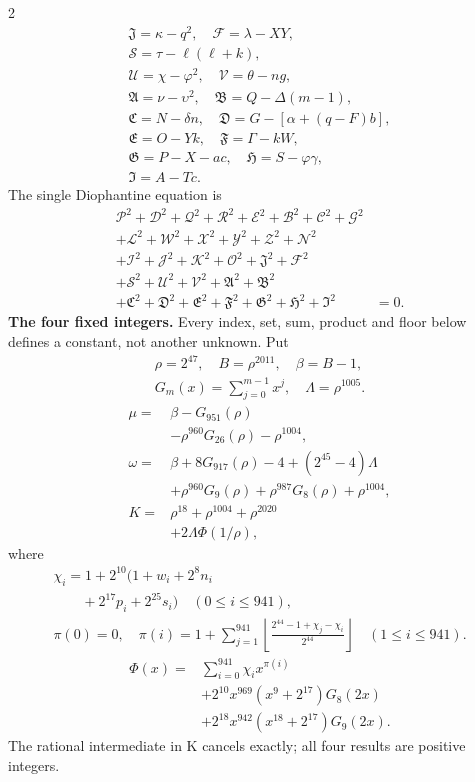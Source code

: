 \documentclass[10pt]{article}
\newcommand{\fl}[1]{\left\lfloor#1\right\rfloor}
\begin{document}
\begin{multicols}{2}
\[\begin{gathered}
\mathfrak{J}=\kappa-q^2,\quad\mathcal{F}=\lambda-XY,\\
\mathcal{S}=\tau-\ell(\ell+k),\\
\mathcal{U}=\chi-\varphi^2,\quad\mathcal{V}=\theta-ng,\\
\mathfrak{A}=\nu-\upsilon^2,\quad\mathfrak{B}=Q-\Delta(m-1),\\
\mathfrak{C}=N-\delta n,\quad\mathfrak{D}=G-[\alpha+(q-F)b],\\
\mathfrak{E}=O-Yk,\quad\mathfrak{F}=\Gamma-kW,\\
\mathfrak{G}=P-X-ac,\quad\mathfrak{H}=S-\varphi\gamma,\\
\mathfrak{I}=A-Tc.
\end{gathered}
\]
The single Diophantine equation is
\[
\begin{split}
\mathcal{P}^2+\mathcal{D}^2+\mathcal{Q}^2+\mathcal{R}^2+\mathcal{E}^2+\mathcal{B}^2+\mathcal{C}^2+\mathcal{G}^2 &\\
+\mathcal{L}^2+\mathcal{W}^2+\mathcal{X}^2+\mathcal{Y}^2+\mathcal{Z}^2+\mathcal{N}^2 &\\
+\mathcal{I}^2+\mathcal{J}^2+\mathcal{K}^2+\mathcal{O}^2+\mathfrak{J}^2+\mathcal{F}^2 &\\
+\mathcal{S}^2+\mathcal{U}^2+\mathcal{V}^2+\mathfrak{A}^2+\mathfrak{B}^2 &\\
+\mathfrak{C}^2+\mathfrak{D}^2+\mathfrak{E}^2+\mathfrak{F}^2+\mathfrak{G}^2+\mathfrak{H}^2+\mathfrak{I}^2 &= 0.
\end{split}
\]
\textbf{The four fixed integers.}
Every index, set, sum, product and floor below defines a constant, not
another unknown. Put
\[
\begin{gathered}
\rho=2^{47},\quad B=\rho^{2011},\quad\beta=B-1,\\
G_m(x)=\sum_{j=0}^{m-1}x^j,\quad
\Lambda=\rho^{1005}.
\end{gathered}
\]
\begin{align*}
\mu={}&\beta-G_{951}(\rho)\\
&-\rho^{960}G_{26}(\rho)-\rho^{1004},\\
\omega={}&\beta+8G_{917}(\rho)-4+(2^{45}-4)\Lambda\\
&+\rho^{960}G_9(\rho)+\rho^{987}G_8(\rho)
  +\rho^{1004},\\
K={}&\rho^{18}+\rho^{1004}+\rho^{2020}\\
&+2\Lambda\Phi(1/\rho),
\end{align*}
where
\[
\begin{gathered}
\chi_i=1+2^{10}(1+w_i+2^8n_i\\
\qquad+2^{17}p_i+2^{25}s_i)\quad(0\le i\le941),\\
\pi(0)=0,\quad\pi(i)=1+\sum_{j=1}^{941}
\fl{\frac{2^{44}-1+\chi_j-\chi_i}{2^{44}}}\quad(1\le i\le941).
\end{gathered}
\]
\[
\begin{split}
\Phi(x)={}&\sum_{i=0}^{941}\chi_i x^{\pi(i)}\\
&+2^{10}x^{969}(x^9+2^{17})G_8(2x)\\
&+2^{18}x^{942}(x^{18}+2^{17})G_9(2x).
\end{split}
\]
The rational intermediate in K cancels exactly; all four results are positive integers.


\end{multicols}
\end{document}
